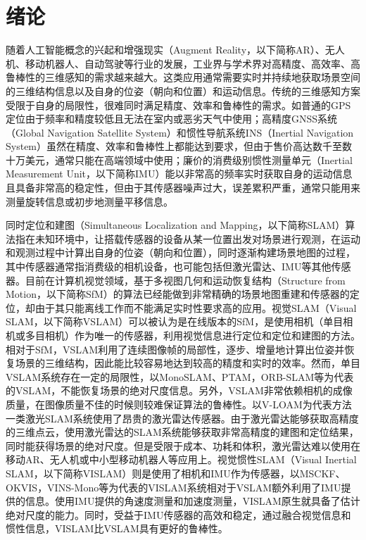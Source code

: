 \chapter{绪论}\label{ch:intro}

随着人工智能概念的兴起和增强现实（Augment Reality，以下简称AR）、无人机、移动机器人、自动驾驶等行业的发展，工业界与学术界对高精度、高效率、高鲁棒性的三维感知的需求越来越大。这类应用通常需要实时并持续地获取场景空间的三维结构信息以及自身的位姿（朝向和位置）和运动信息。传统的三维感知方案受限于自身的局限性，很难同时满足精度、效率和鲁棒性的需求。如普通的GPS定位由于频率和精度较低且无法在室内或恶劣天气中使用；高精度GNSS系统（Global Navigation Satellite System）和惯性导航系统INS（Inertial Navigation System）虽然在精度、效率和鲁棒性上都能达到要求，但由于售价高达数千至数十万美元，通常只能在高端领域中使用；廉价的消费级别惯性测量单元（Inertial Measurement Unit，以下简称IMU）能以非常高的频率实时获取自身的运动信息且具备非常高的稳定性，但由于其传感器噪声过大，误差累积严重，通常只能用来测量旋转信息或初步地测量平移信息。

同时定位和建图（Simultaneous Localization and Mapping，以下简称SLAM）算法指在未知环境中，让搭载传感器的设备从某一位置出发对场景进行观测，在运动和观测过程中计算出自身的位姿（朝向和位置），同时逐渐构建场景地图的过程，其中传感器通常指消费级的相机设备，也可能包括但激光雷达、IMU等其他传感器。目前在计算机视觉领域，基于多视图几何和运动恢复结构（Structure from Motion，以下简称SfM）的算法\citep{hartley2003multiple,ma2012invitation}已经能做到非常精确的场景地图重建和传感器的定位，却由于其只能离线工作而不能满足实时性要求高的应用。视觉SLAM（Visual SLAM，以下简称VSLAM）可以被认为是在线版本的SfM，是使用相机（单目相机或多目相机）作为唯一的传感器，利用视觉信息进行定位和定位和建图的方法。相对于SfM，VSLAM利用了连续图像帧的局部性，逐步、增量地计算出位姿并恢复场景的三维结构，因此能比较容易地达到较高的精度和实时的效率。然而，单目VSLAM系统存在一定的局限性，以MonoSLAM\citep{davison2007monoslam}、PTAM\citep{klein2007parallel}，ORB-SLAM\citep{mur2015orb}等为代表的VSLAM，不能恢复场景的绝对尺度信息。另外，VSLAM非常依赖相机的成像质量，在图像质量不佳的时候则较难保证算法的鲁棒性。以V-LOAM\citep{zhang2015visual}为代表方法一类激光SLAM系统使用了昂贵的激光雷达传感器。由于激光雷达能够获取高精度的三维点云，使用激光雷达的SLAM系统能够获取非常高精度的建图和定位结果，同时能获得场景的绝对尺度。但是受限于成本、功耗和体积，激光雷达难以使用在移动AR、无人机或中小型移动机器人等应用上。视觉惯性SLAM（Visual Inertial SLAM，以下简称VISLAM）则是使用了相机和IMU作为传感器，以MSCKF\citep{mourikis2007multi}、OKVIS\citep{leutenegger2015keyframe}，VINS-Mono\citep{qin2018vins}等为代表的VISLAM系统相对于VSLAM额外利用了IMU提供的信息。使用IMU提供的角速度测量和加速度测量，VISLAM原生就具备了估计绝对尺度的能力。同时，受益于IMU传感器的高效和稳定，通过融合视觉信息和惯性信息，VISLAM比VSLAM具有更好的鲁棒性。


